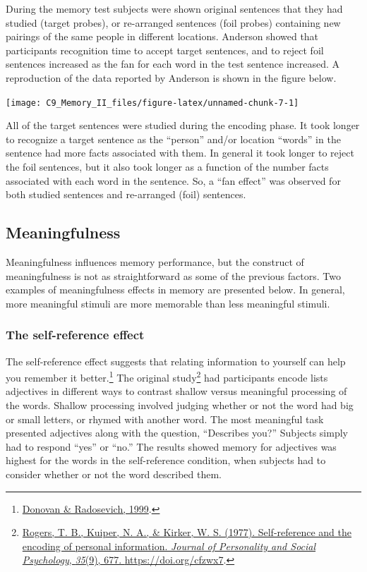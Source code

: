 \documentclass[
  oneside,
  12pt]{crumpbook}
\begin{document}
During the memory test subjects were shown original sentences that they had studied (target probes), or re-arranged sentences (foil probes) containing new pairings of the same people in different locations. Anderson showed that participants recognition time to accept target sentences, and to reject foil sentences increased as the fan for each word in the test sentence increased. A reproduction of the data reported by Anderson is shown in the figure below.

\texttt{[image: C9\_Memory\_II\_files/figure-latex/unnamed-chunk-7-1]}

All of the target sentences were studied during the encoding phase. It took longer to recognize a target sentence as the ``person'' and/or location ``words'' in the sentence had more facts associated with them. In general it took longer to reject the foil sentences, but it also took longer as a function of the number facts associated with each word in the sentence. So, a ``fan effect'' was observed for both studied sentences and re-arranged (foil) sentences.

\hypertarget{meaningfulness}{%
\subsection{Meaningfulness}\label{meaningfulness}}

Meaningfulness influences memory performance, but the construct of meaningfulness is not as straightforward as some of the previous factors. Two examples of meaningfulness effects in memory are presented below. In general, more meaningful stimuli are more memorable than less meaningful stimuli.

\hypertarget{the-self-reference-effect}{%
\subsubsection{The self-reference effect}\label{the-self-reference-effect}}

The self-reference effect suggests that relating information to yourself can help you remember it better.\footnote{\protect\hyperlink{ref-donovanMetaanalyticReviewDistribution1999}{Donovan \& Radosevich, 1999}.} The original study\footnote{\protect\hyperlink{ref-rogersSelfreferenceEncodingPersonal1977}{Rogers, T. B., Kuiper, N. A., \& Kirker, W. S. (1977). Self-reference and the encoding of personal information. \emph{Journal of Personality and Social Psychology}, \emph{35}(9), 677. \url{https://doi.org/cfzwx7}}.} had participants encode lists adjectives in different ways to contrast shallow versus meaningful processing of the words. Shallow processing involved judging whether or not the word had big or small letters, or rhymed with another word. The most meaningful task presented adjectives along with the question, ``Describes you?'' Subjects simply had to respond ``yes'' or ``no.'' The results showed memory for adjectives was highest for the words in the self-reference condition, when subjects had to consider whether or not the word described them.
\end{document}
